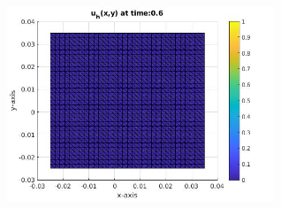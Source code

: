 \documentclass[a4paper,11pt]{article}
\begin{document}
\begin{figure}[h]
\begin{subfigure}{0.4\textwidth}
	\end{subfigure}
	\begin{subfigure}{0.4\textwidth}
		\includegraphics[width =8cm]{./tc2-1/060.jpg}
	\end{subfigure}
\end{figure}
\restoregeometry
\newpage
{} 
\end{document}
